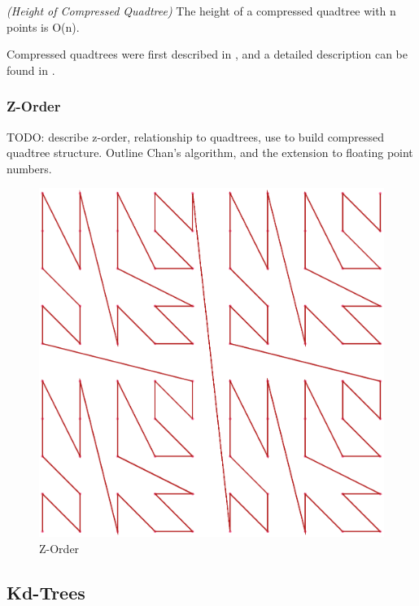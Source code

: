 \documentclass[mcs]{scsthesis}
\begin{document}
\begin{thm} \emph{(Height of Compressed Quadtree)}
The height of a compressed quadtree with n points is O(n).
\end{thm}

Compressed quadtrees were first described in \cite{compressedquadtree}, and a
detailed description can be found in \cite{skipquadtree}.

\subsubsection{Z-Order}

TODO: describe z-order, relationship to quadtrees, use to build compressed
quadtree structure.  Outline Chan's algorithm, and the extension to
floating point numbers.

\begin{figure}
\begin{center}
\includegraphics[scale=0.4]{diagrams/zorder.eps}
\caption{Z-Order}
\end{center}
\end{figure}


\subsection{Kd-Trees}
\end{document}
